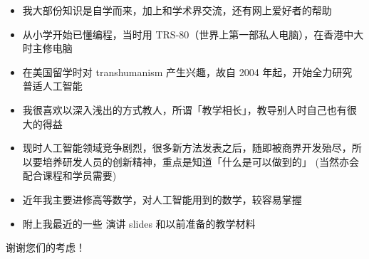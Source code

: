 \documentclass[10pt,a4paper]{altacv}
\begin{document}

\begin{fullwidth}
\makecvheader
\end{fullwidth}





\begin{itemize}
\item 我大部份知识是自学而来，加上和学术界交流，还有网上爱好者的帮助
\item 从小学开始已懂编程，当时用 TRS-80（世界上第一部私人电脑），在香港中大时主修电脑
\item 在美国留学时对 transhumanism 产生兴趣，故自 2004 年起，开始全力研究 普适人工智能
\item 我很喜欢以深入浅出的方式教人，所谓「教学相长」，教导别人时自己也有很大的得益
\item 现时人工智能领域竞争剧烈，很多新方法发表之后，随即被商界开发殆尽，所以要培养研发人员的创新精神，重点是知道「什么是可以做到的」
 (当然亦会配合课程和学员需要)
\item 近年我主要进修高等数学，对人工智能用到的数学，较容易掌握
\item 附上我最近的一些 演讲 slides 和以前准备的教学材料
\end{itemize}
谢谢您们的考虑！
\end{document}
